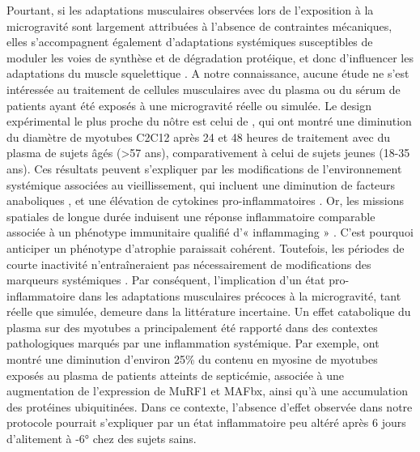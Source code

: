 \documentclass[11pt]{report}
\begin{document}
Pourtant, si les adaptations musculaires observées lors de l'exposition à la microgravité sont largement attribuées à l'absence de contraintes mécaniques, elles s'accompagnent également d'adaptations systémiques susceptibles de moduler les voies de synthèse et de dégradation protéique, et donc d'influencer les adaptations du muscle squelettique \parencite{lee_factors_2022}. A notre connaissance, aucune étude ne s'est intéressée au traitement de cellules musculaires avec du plasma ou du sérum de patients ayant été exposés à une microgravité réelle ou simulée. Le design expérimental le plus proche du nôtre est celui de \textcite{Kalampouka2018Feb}, qui ont montré une diminution du diamètre de myotubes C2C12 après 24 et 48 heures de traitement avec du plasma de sujets âgés (>57 ans), comparativement à celui de sujets jeunes (18-35 ans). Ces résultats peuvent s'expliquer par les modifications de l'environnement systémique associées au vieillissement, qui incluent une diminution de facteurs anaboliques \parencite{Sellami2017Aug,Ratkevicius2011Jun}, et une élévation de cytokines pro-inflammatoires \parencite{Alvarez-Rodriguez2012}. Or, les missions spatiales de longue durée induisent une réponse inflammatoire comparable associée à un phénotype immunitaire qualifié d'« inflammaging » \parencite{navasiolava_vascular_2020,strollo_aging-like_2021}. C'est pourquoi anticiper un phénotype d'atrophie paraissait cohérent. Toutefois, les périodes de courte inactivité n'entraîneraient pas nécessairement de modifications des marqueurs systémiques \parencite{navasiolava_vascular_2020}. Par conséquent, l'implication d'un état pro-inflammatoire dans les adaptations musculaires précoces à la microgravité, tant réelle que simulée, demeure dans la littérature incertaine. Un effet catabolique du plasma sur des myotubes a principalement été rapporté dans des contextes pathologiques marqués par une inflammation systémique. Par exemple, \textcite{vanHees2011} ont montré une diminution d'environ 25\% du contenu en myosine de myotubes exposés au plasma de patients atteints de septicémie, associée à une augmentation de l'expression de MuRF1 et MAFbx, ainsi qu'à une accumulation des protéines ubiquitinées. Dans ce contexte, l'absence d'effet observée dans notre protocole pourrait s'expliquer par un état inflammatoire peu altéré après 6 jours d'alitement à -6° chez des sujets sains.
\end{document}
